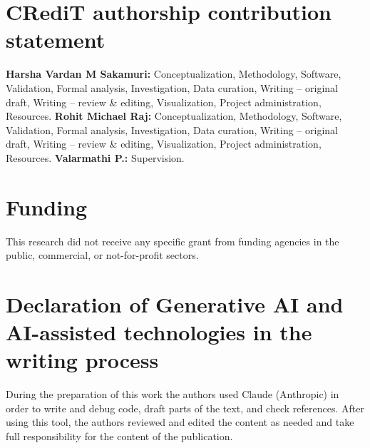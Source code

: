 \documentclass[preprint,12pt,authoryear]{elsarticle}
\begin{document}
\section*{CRediT authorship contribution statement}
\textbf{Harsha Vardan M Sakamuri:} Conceptualization, Methodology, Software, Validation, Formal analysis, Investigation, Data curation, Writing -- original draft, Writing -- review \& editing, Visualization, Project administration, Resources.
\textbf{Rohit Michael Raj:} Conceptualization, Methodology, Software, Validation, Formal analysis, Investigation, Data curation, Writing -- original draft, Writing -- review \& editing, Visualization, Project administration, Resources.
\textbf{Valarmathi P.:} Supervision.

\section*{Funding}
This research did not receive any specific grant from funding agencies in the public, commercial, or not-for-profit sectors.

\section*{Declaration of Generative AI and AI-assisted technologies in the writing process}
During the preparation of this work the authors used Claude (Anthropic) in order to write and debug code, draft parts of the text, and check references. After using this tool, the authors reviewed and edited the content as needed and take full responsibility for the content of the publication.



\end{document}
